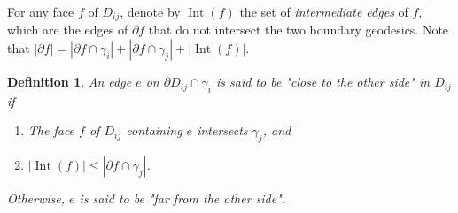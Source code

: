 \documentclass[a4paper]{article}
\DeclareMathOperator{\Int}{Int}
\newtheorem{defi}[thm]{Definition}
\theoremstyle{remark}
\begin{document}
For any face $f$ of $D_{ij}$, denote by $\Int(f)$ the set of \textit{intermediate edges} of $f$, which are the edges of $\partial f$ that do not intersect the two boundary geodesics. Note that $|\partial f| = |\partial f\cap \gamma_i| + |\partial f\cap \gamma_j| + |\Int(f)|$.

\begin{defi}
    An edge $e$ on $\partial D_{ij}\cap \gamma_i$ is said to be "close to the other side" in $D_{ij}$ if 
    \begin{enumerate}
        \item The face $f$ of $D_{ij}$ containing $e$ intersects $\gamma_j$, and
        \item $|\Int(f)|\leq |\partial f\cap \gamma_j|$.
    \end{enumerate}
    Otherwise, $e$ is said to be "far from the other side".
\end{defi}
\end{document}
